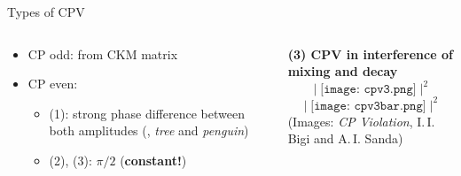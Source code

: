 \begin{frame}{Types of CPV}
\begin{columns}[T]
\begin{column}{.66\textwidth}
            \vspace{5mm}
            \begin{itemize}
                \item CP odd: from CKM matrix
                \item CP even:
                \begin{itemize}
                    \item (1): strong phase difference between both amplitudes (\eg{}, \textit{tree} and \textit{penguin})
                    \item (2), (3): $\pi / 2$ (\textbf{constant!})
                \end{itemize}
            \end{itemize}
        \end{column}
        \begin{column}{.33\textwidth}
            \centering
            \textbf{(3) CPV in interference of mixing and decay}
            \begin{equation*}
                \left| \; \texttt{[image: cpv3.png]} \; \right|^2
            \end{equation*}
            \scalebox{1.5}{$\neq$}
            \begin{equation*}
                \left| \; \texttt{[image: cpv3bar.png]} \; \right|^2
            \end{equation*}
            {\tiny \hfill(Images: \textit{CP Violation}, I.\,I. Bigi and A.\,I. Sanda)}
        \end{column}
    \end{columns}
\end{frame}

